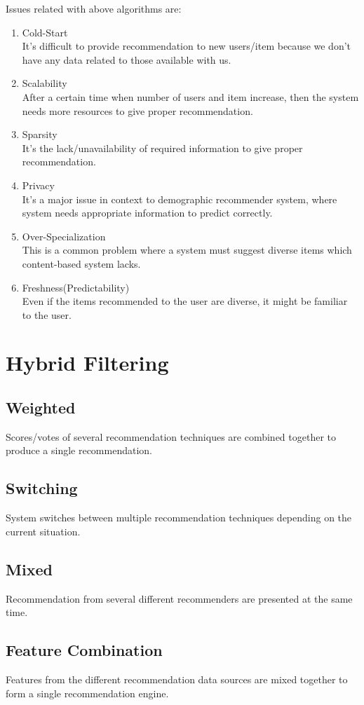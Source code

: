 \documentclass[conference]{IEEEtran}
\begin{document}
	Issues related with above algorithms are:
		\begin{enumerate}
		\item Cold-Start\\
				It's difficult to provide recommendation to new users/item because we don't have any data related to those available with us.
		\item Scalability\\
				After a certain time when number of users and item increase, then the system needs more resources to give proper recommendation.
		\item Sparsity\\
				It's the lack/unavailability of required information to give proper recommendation.	
		\item Privacy\\
				It's a major issue in context to demographic recommender system, where system needs appropriate information to predict correctly.
		\item Over-Specialization\\
				This is a common problem where a system must suggest diverse items which content-based system lacks.
		\item Freshness(Predictability)\cite{paper2}\\
				Even if the items recommended to the user are diverse, it might be familiar to the user. 
		\end{enumerate}
	
\section{Hybrid Filtering}

	\subsection{Weighted}
		Scores/votes of several recommendation techniques are combined together to produce a single recommendation.
	\subsection{Switching}
		System switches between multiple recommendation techniques depending on the current situation. 
	\subsection{Mixed}
		Recommendation from several different recommenders are presented at the same time.
	\subsection{Feature Combination}
		Features from the different recommendation data sources are mixed together to form a single recommendation engine.
\end{document}
